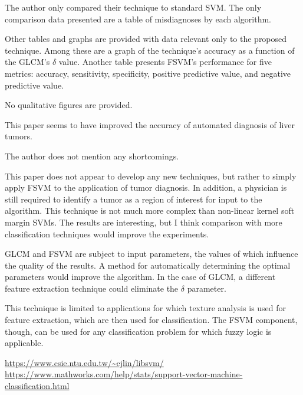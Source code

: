 \documentclass[11pt]{article}
\begin{document}
\begin{description}[leftmargin=0in]
    \item [Experiments] The author only compared their technique to standard
        SVM. The only comparison data presented are a table of misdiagnoses by
        each algorithm.

        Other tables and graphs are provided with data relevant only to the
        proposed technique. Among these are a graph of the technique's accuracy
        as a function of the GLCM's $\delta$ value. Another table presents
        FSVM's performance for five metrics: accuracy, sensitivity, specificity,
        positive predictive value, and negative predictive value.

        No qualitative figures are provided.

    \item [Contributions] This paper seems to have improved the accuracy of
        automated diagnosis of liver tumors.

    \item [Shortcomings] The author does not mention any shortcomings.

    \item [Self Evaluation] This paper does not appear to develop any new
        techniques, but rather to simply apply FSVM to the application of tumor
        diagnosis. In addition, a physician is still required to identify a
        tumor as a region of interest for input to the algorithm. This technique
        is not much more complex than non-linear kernel soft margin SVMs. The
        results are interesting, but I think comparison with more classification
        techniques would improve the experiments.

    \item [Improvements] GLCM and FSVM are subject to input parameters, the
        values of which influence the quality of the results. A method for
        automatically determining the optimal parameters would improve the
        algorithm. In the case of GLCM, a different feature extraction technique
        could eliminate the $\delta$ parameter.

    \item [Applications] This technique is limited to applications for which
        texture analysis is used for feature extraction, which are then used for
        classification. The FSVM component, though, can be used for any
        classification problem for which fuzzy logic is applicable.

    \item [Packages] \url{https://www.csie.ntu.edu.tw/~cjlin/libsvm/} \\
        \url{https://www.mathworks.com/help/stats/support-vector-machine-classification.html}
\end{description}

 
\end{document}
